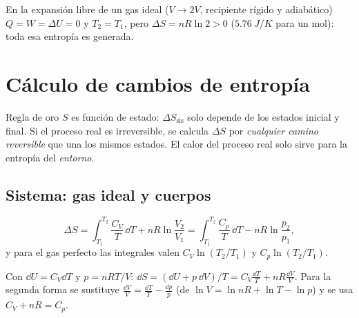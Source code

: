 \begin{observacion}[$Q=0$ no implica $\Delta S=0$]
En la expansión libre de un gas ideal ($V\to2V$, recipiente rígido y adiabático) $Q=W=\Delta U=0$ y
$T_2=T_1$, pero $\Delta S=nR\ln2>0$ ($\SI{5,76}{J/K}$ para un mol): toda esa entropía es generada.
\end{observacion}

\section{Cálculo de cambios de entropía}

\begin{recuadro}{Regla de oro}
$S$ es función de estado: $\Delta S_{\mathrm{sis}}$ solo depende de los estados inicial y final. Si el proceso
real es irreversible, se calcula $\Delta S$ por \emph{cualquier camino reversible} que una los mismos estados.
El calor del proceso real solo sirve para la entropía del \emph{entorno}.
\end{recuadro}

\subsection{Sistema: gas ideal y cuerpos}

\begin{proposicion}
\begin{equation}\label{eq:Sgas}
  \Delta S=\int_{T_1}^{T_2}\frac{C_V}{T}\,\dd T+nR\ln\frac{V_2}{V_1}
          =\int_{T_1}^{T_2}\frac{C_p}{T}\,\dd T-nR\ln\frac{p_2}{p_1},
\end{equation}
y para el gas perfecto las integrales valen $C_V\ln(T_2/T_1)$ y $C_p\ln(T_2/T_1)$.
\end{proposicion}

\begin{demostracion}
Con $\dd U=C_V\dd T$ y $p=nRT/V$: $\dd S=(\dd U+p\,\dd V)/T=C_V\frac{\dd T}{T}+nR\frac{\dd V}{V}$. Para la segunda
forma se sustituye $\frac{\dd V}{V}=\frac{\dd T}{T}-\frac{\dd p}{p}$ (de $\ln V=\ln nR+\ln T-\ln p$) y se usa
$C_V+nR=C_p$.
\end{demostracion}

